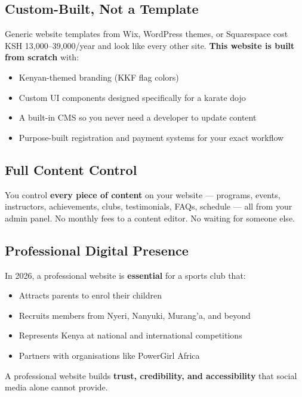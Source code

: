 \documentclass[12pt,a4paper]{article}
\begin{document}
\subsection{Custom-Built, Not a Template}

Generic website templates from Wix, WordPress themes, or Squarespace cost KSH 13,000--39,000/year and look like every other site. \textbf{This website is built from scratch} with:

\begin{itemize}[leftmargin=1.5em]
    \item Kenyan-themed branding (KKF flag colors)
    \item Custom UI components designed specifically for a karate dojo
    \item A built-in CMS so you never need a developer to update content
    \item Purpose-built registration and payment systems for your exact workflow
\end{itemize}

\subsection{Full Content Control}

You control \textbf{every piece of content} on your website --- programs, events, instructors, achievements, clubs, testimonials, FAQs, schedule --- all from your admin panel. No monthly fees to a content editor. No waiting for someone else.

\subsection{Professional Digital Presence}

In 2026, a professional website is \textbf{essential} for a sports club that:

\begin{itemize}[leftmargin=1.5em]
    \item Attracts parents to enrol their children
    \item Recruits members from Nyeri, Nanyuki, Murang'a, and beyond
    \item Represents Kenya at national and international competitions
    \item Partners with organisations like PowerGirl Africa
\end{itemize}

A professional website builds \textbf{trust, credibility, and accessibility} that social media alone cannot provide.
\end{document}
